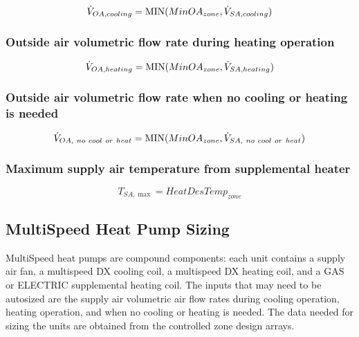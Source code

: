\begin{equation}
\dot V_{OA,cooling} = {\rm{MIN}}(MinO{A_{zone}},\dot V_{SA,cooling})
\end{equation}

\subsubsection{Outside air volumetric flow rate during heating operation}\label{outside-air-volumetric-flow-rate-during-heating-operation}

\begin{equation}
\dot V_{OA,heating} = {\rm{MIN}}(MinO{A_{zone}},\dot V_{SA,heating})
\end{equation}

\subsubsection{Outside air volumetric flow rate when no cooling or heating is needed}\label{outside-air-volumetric-flow-rate-when-no-cooling-or-heating-is-needed}

\begin{equation}
\dot V_{OA,~no~cool~or~heat} = {\rm{MIN}}(MinO{A_{zone}},\dot V_{SA,~no~cool~or~heat})
\end{equation}

\subsubsection{Maximum supply air temperature from supplemental heater}\label{maximum-supply-air-temperature-from-supplemental-heater}

\begin{equation}
{T_{SA,\max }} = HeatDesTem{p_{zone}}
\end{equation}

\subsection{MultiSpeed Heat Pump Sizing}\label{multispeed-heat-pump-sizing}

MultiSpeed heat pumps are compound components: each unit contains a supply air fan, a multispeed DX cooling coil, a multispeed DX heating coil, and a GAS or ELECTRIC supplemental heating coil. The inputs that may need to be autosized are the supply air volumetric air flow rates during cooling operation, heating operation, and when no cooling or heating is needed. The data needed for sizing the units are obtained from the controlled zone design arrays.

